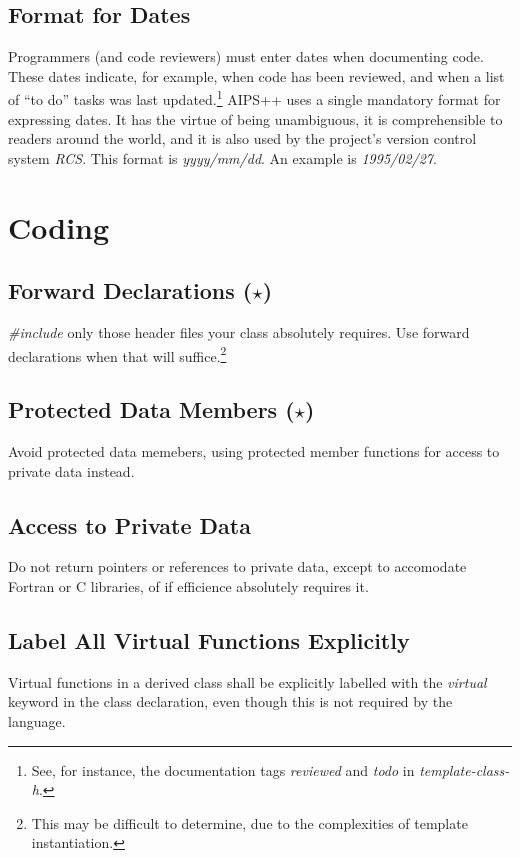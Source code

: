 \subsection {Format for Dates}
Programmers (and code reviewers) must enter dates when documenting code.
These dates indicate, for example, when code has been reviewed, and when a list 
of ``to do'' tasks was last updated.\footnote{See, for instance, the 
documentation tags {\em reviewed} and {\em todo} in {\em template-class-h}.}
AIPS++ uses a single mandatory format for expressing dates.  It has the virtue
of being unambiguous, it is comprehensible to readers around the world, and
it is also used by the project's version control system {\em RCS}.  This 
format is {\em yyyy/mm/dd}. An example is {\em 1995/02/27}.
\section {Coding}
\subsection {Forward Declarations ($\star$)}
{\em \#include} only those header files your class absolutely requires.  Use
forward declarations when that will suffice.\footnote {This may be difficult
to determine, due to the complexities of template instantiation.}
\subsection {Protected Data Members ($\star$)}
Avoid protected data memebers, using protected member functions for access
to private data instead.
\subsection {Access to Private Data}
Do not return pointers or references to private data, except to accomodate
Fortran or C libraries, of if efficience absolutely requires it.
\subsection {Label All Virtual Functions Explicitly}
Virtual functions in a derived class shall be explicitly labelled with
the {\em virtual} keyword in the class declaration, even though this is
 not required by the language.
